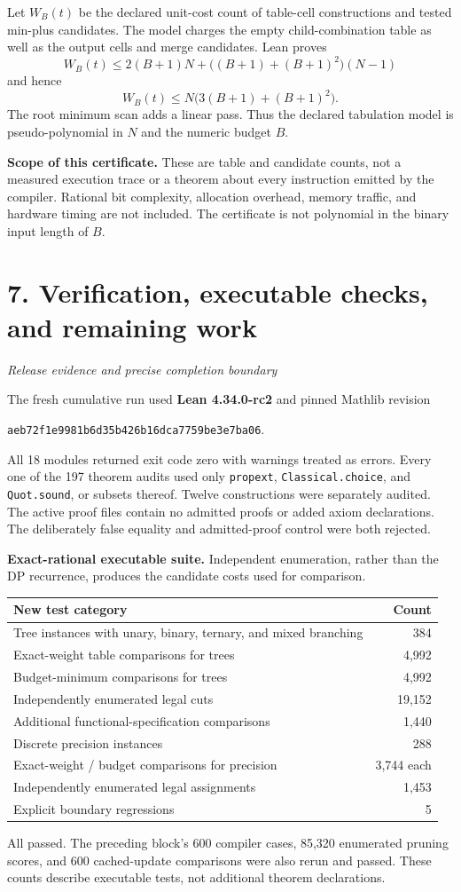 \documentclass[11pt]{article}
\newcommand{\code}[1]{\texttt{\small #1}}
\newcommand{\pageheading}[2]{\section*{\color{ink}#1}\textit{#2}\par}
\begin{document}
Let $W_B(t)$ be the declared unit-cost count of table-cell constructions and tested min-plus candidates. The model charges the empty child-combination table as well as the output cells and merge candidates. Lean proves
\[
W_B(t)\leq2(B+1)N+\bigl((B+1)+(B+1)^2\bigr)(N-1)
\]
and hence
\[
\boxed{W_B(t)\leq N\bigl(3(B+1)+(B+1)^2\bigr).}
\]
The root minimum scan adds a linear pass. Thus the declared tabulation model is pseudo-polynomial in $N$ and the numeric budget $B$.

\textbf{Scope of this certificate.} These are table and candidate counts, not a measured execution trace or a theorem about every instruction emitted by the compiler. Rational bit complexity, allocation overhead, memory traffic, and hardware timing are not included. The certificate is not polynomial in the binary input length of $B$.

\newpage
\pageheading{7. Verification, executable checks, and remaining work}{Release evidence and precise completion boundary}
The fresh cumulative run used \textbf{Lean 4.34.0-rc2} and pinned Mathlib revision
\begin{center}\code{aeb72f1e9981b6d35b426b16dca7759be3e7ba06}.\end{center}
All 18 modules returned exit code zero with warnings treated as errors. Every one of the 197 theorem audits used only \code{propext}, \code{Classical.choice}, and \code{Quot.sound}, or subsets thereof. Twelve constructions were separately audited. The active proof files contain no admitted proofs or added axiom declarations. The deliberately false equality and admitted-proof control were both rejected.

\textbf{Exact-rational executable suite.} Independent enumeration, rather than the DP recurrence, produces the candidate costs used for comparison.
\begin{center}\small
\renewcommand{\arraystretch}{1.18}
\begin{tabular}{@{}p{}r@{}}
\toprule
New test category & Count\\
\midrule
Tree instances with unary, binary, ternary, and mixed branching & 384\\
Exact-weight table comparisons for trees & 4,992\\
Budget-minimum comparisons for trees & 4,992\\
Independently enumerated legal cuts & 19,152\\
Additional functional-specification comparisons & 1,440\\
Discrete precision instances & 288\\
Exact-weight / budget comparisons for precision & 3,744 each\\
Independently enumerated legal assignments & 1,453\\
Explicit boundary regressions & 5\\
\bottomrule
\end{tabular}
\end{center}
All passed. The preceding block's 600 compiler cases, 85,320 enumerated pruning scores, and 600 cached-update comparisons were also rerun and passed. These counts describe executable tests, not additional theorem declarations.
\end{document}
